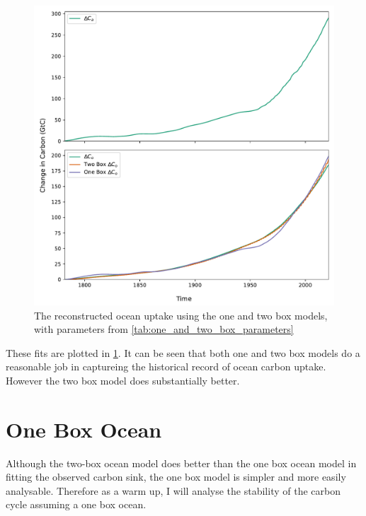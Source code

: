 \begin{figure}
  \centering
  \includegraphics[keepaspectratio,width=\textwidth]{gcb_ocean_atmosphere_boxes}
  \caption{The reconstructed ocean uptake using the one and two box models, with parameters from \cref{tab:one_and_two_box_parameters}}
  \label{fig:fits_from_one_and_two}
\end{figure}


These fits are plotted in \cref{fig:fits_from_one_and_two}. It can be seen that both one and two box models do a reasonable job in captureing the
historical record of ocean carbon uptake. However the two box model does substantially better.

\section{One Box Ocean}
Although the two-box ocean model does better than the one box ocean model in fitting the observed carbon sink, the one box model is simpler
and more easily analysable. Therefore as a warm up, I will analyse the stability of the carbon cycle assuming a one box ocean.

